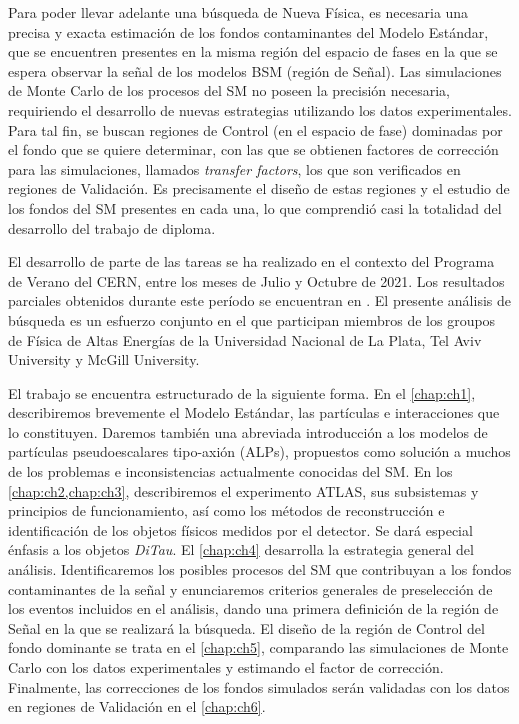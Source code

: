 Para poder llevar adelante una búsqueda de Nueva Física, es necesaria una precisa y exacta estimación de los fondos contaminantes del Modelo Estándar, que se encuentren presentes en la misma región del espacio de fases en la que se espera observar la señal de los modelos BSM (región de Señal). Las simulaciones de Monte Carlo de los procesos del SM no poseen la precisión necesaria, requiriendo el desarrollo de nuevas estrategias utilizando los datos experimentales. Para tal fin, se buscan regiones de Control (en el espacio de fase) dominadas por el fondo que se quiere determinar, con las que se obtienen factores de corrección para las simulaciones, llamados \textit{transfer factors}, los que son verificados en regiones de Validación. Es precisamente el diseño de estas regiones y el estudio de los fondos del SM presentes en cada una, lo que comprendió casi la totalidad del desarrollo del trabajo de diploma.

El desarrollo de parte de las tareas se ha realizado en el contexto del Programa de Verano del CERN, entre los meses de Julio y Octubre de 2021. Los resultados parciales obtenidos durante este período se encuentran en \cite{Beaucamp:2790493}. El presente análisis de búsqueda es un esfuerzo conjunto en el que participan miembros de los groupos de Física de Altas Energías de la Universidad Nacional de La Plata, Tel Aviv University y McGill University.

El trabajo se encuentra estructurado de la siguiente forma. En el \cref{chap:ch1}, describiremos brevemente el Modelo Estándar, las partículas e interacciones que lo constituyen. Daremos también una abreviada introducción a los modelos de partículas pseudoescalares tipo-axión (ALPs), propuestos como solución a muchos de los problemas e inconsistencias actualmente conocidas del SM. En los \cref{chap:ch2,chap:ch3}, describiremos el experimento ATLAS, sus subsistemas y principios de funcionamiento, así como los métodos de reconstrucción e identificación de los objetos físicos medidos por el detector. Se dará especial énfasis a los objetos \textit{DiTau}. El \cref{chap:ch4} desarrolla la estrategia general del análisis. Identificaremos los posibles procesos del SM que contribuyan a los fondos contaminantes de la señal y enunciaremos criterios generales de preselección de los eventos incluidos en el análisis, dando una primera definición de la región de Señal en la que se realizará la búsqueda. El diseño de la región de Control del fondo dominante se trata en el \cref{chap:ch5}, comparando las simulaciones de Monte Carlo con los datos experimentales y estimando el factor de corrección. Finalmente, las correcciones de los fondos simulados serán validadas con los datos en regiones de Validación en el \cref{chap:ch6}. 

\cleardoublepage{}